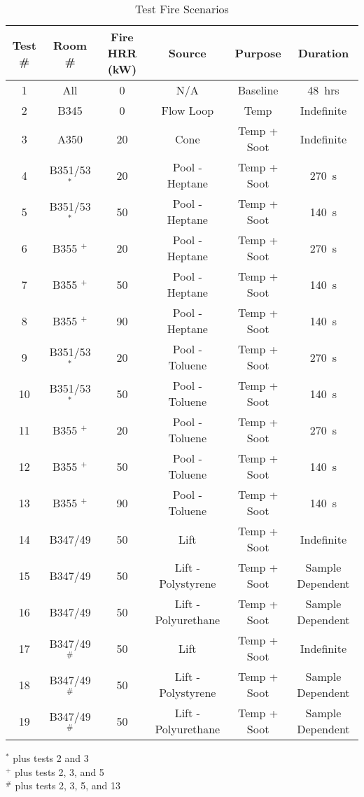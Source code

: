 \documentclass[12pt,oneside]{book}
\begin{document}
\begin{table}[!h]
\centering
\caption{Test Fire Scenarios}
\label{tab:fires}
\begin{tabular}{cccccc}
\toprule[1.5pt]
Test \# & Room \# & Fire HRR (kW) & Source & Purpose & Duration  \\
\midrule
1  &  All             & 0    & N/A                 & Baseline      & 48~hrs \\
2  &  B345            & 0    & Flow Loop           & Temp          & Indefinite \\
3  &  A350            & 20   & Cone                & Temp + Soot   & Indefinite \\
4  &  B351/53 $^*$    & 20   & Pool - Heptane      & Temp + Soot   & 270~s  \\
5  &  B351/53 $^*$    & 50   & Pool - Heptane      & Temp + Soot   & 140~s \\
6  &  B355 $^+$       & 20   & Pool - Heptane      & Temp + Soot   & 270~s \\
7  &  B355 $^+$       & 50   & Pool - Heptane      & Temp + Soot   & 140~s \\
8  &  B355 $^+$       & 90   & Pool - Heptane      & Temp + Soot   & 140~s \\
9  &  B351/53 $^*$    & 20   & Pool - Toluene      & Temp + Soot   & 270~s  \\
10 &  B351/53 $^*$    & 50   & Pool - Toluene      & Temp + Soot   & 140~s \\
11 &  B355 $^+$       & 20   & Pool - Toluene      & Temp + Soot   & 270~s \\
12 &  B355 $^+$       & 50   & Pool - Toluene      & Temp + Soot   & 140~s \\
13 &  B355 $^+$       & 90   & Pool - Toluene      & Temp + Soot   & 140~s \\
14 &  B347/49         & 50   & Lift                & Temp + Soot   & Indefinite \\
15 &  B347/49         & 50   & Lift - Polystyrene  & Temp + Soot   & Sample Dependent \\
16 &  B347/49         & 50   & Lift - Polyurethane & Temp + Soot   & Sample Dependent \\
17 &  B347/49$^\#$    & 50   & Lift                & Temp + Soot   & Indefinite \\
18 &  B347/49$^\#$    & 50   & Lift - Polystyrene  & Temp + Soot   & Sample Dependent \\
19 &  B347/49$^\#$    & 50   & Lift - Polyurethane & Temp + Soot   & Sample Dependent \\
\bottomrule[1.25pt]
\end{tabular}\par
\raggedright
$^*$ plus tests 2 and 3 \\
$^+$ plus tests 2, 3, and 5 \\
$^\#$ plus tests 2, 3, 5, and 13 \\
\end{table}
\justify
\end{document}
